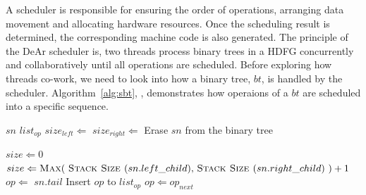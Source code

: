        A scheduler is responsible for ensuring the order of operations, 
        arranging data movement and allocating hardware resources.
        Once the scheduling result is determined, the corresponding machine code is also generated.
        The principle of the DeAr scheduler is, 
        two threads process binary trees in a HDFG concurrently and collaboratively until all operations are scheduled.
        Before exploring how threads co-work, we need to look into how a binary tree, $bt$, is handled by the scheduler.
        Algorithm~\ref{alg:sbt}, , 
        demonstrates how operaions of a $bt$ are scheduled into a specific sequence.
\begin{algorithm}[!ht]
    \caption{}
    \begin{algorithmic}[1]
        \Require    $sn$
        \Ensure     $list_{op}$
                \label{line:sbts}
            \State $size_{left} \Leftarrow$ 
            \State $size_{right} \Leftarrow$ 
                \State {}
            \Else
                \State {}
            \EndIf
        \EndIf
        \State {}   
        \State Erase $sn$ from the binary tree
            \State {}
        \EndIf

        \label{line:sbte}
        \Statex
      \label{line:gsss}
            \State $size \Leftarrow 0$
        \Else
            \State $size \Leftarrow \text{\textproc{Max}(\ \textproc{Stack Size }($sn.left\_child$), \textproc{Stack Size }($sn.right\_child$)\ )} + 1$
        \EndIf
        \State {}
    \EndFunction                    \label{line:gsse}
    \Statex
      \label{line:ssns}
       \State   $op \Leftarrow$ $sn.tail$
       \Do   
           \State Insert $op$ to $list_{op}$
           \State $op \Leftarrow op_{next}$
    \EndFunction                            \label{line:ssne}

    \end{algorithmic}
    \label{alg:sbt}
\end{algorithm}
